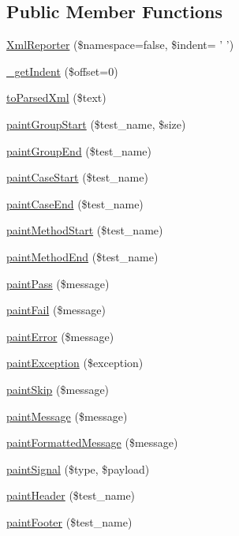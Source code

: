 \subsection*{Public Member Functions}
\begin{DoxyCompactItemize}
\item 
\hyperlink{class_xml_reporter_a3d2fe0351607e3552290a523825f2c71}{XmlReporter} (\$namespace=false, \$indent= ' ')
\item 
\hyperlink{class_xml_reporter_ab4a23bb48d3575347b0e5259e49a1b6f}{\_\-getIndent} (\$offset=0)
\item 
\hyperlink{class_xml_reporter_a5fda8560592459439b2f12436be5f352}{toParsedXml} (\$text)
\item 
\hyperlink{class_xml_reporter_a8260073ecaba7369ae53fde9251d1ef5}{paintGroupStart} (\$test\_\-name, \$size)
\item 
\hyperlink{class_xml_reporter_a448424e6e8bce6060c6ad6109fcb2300}{paintGroupEnd} (\$test\_\-name)
\item 
\hyperlink{class_xml_reporter_aebd11df8a848fa3f5b2d0d1b725249c1}{paintCaseStart} (\$test\_\-name)
\item 
\hyperlink{class_xml_reporter_a1d5e2bab9c6f61d49e65ec55e9a04015}{paintCaseEnd} (\$test\_\-name)
\item 
\hyperlink{class_xml_reporter_a9d879c209e50eadfcdbd8e3bfc7ba226}{paintMethodStart} (\$test\_\-name)
\item 
\hyperlink{class_xml_reporter_ae021130f96f98f7ff693740c331c31ae}{paintMethodEnd} (\$test\_\-name)
\item 
\hyperlink{class_xml_reporter_a0ca13e019e6eac83f1f5c91cae05f30d}{paintPass} (\$message)
\item 
\hyperlink{class_xml_reporter_afc04e91cbe663a1d38103392c9672b6f}{paintFail} (\$message)
\item 
\hyperlink{class_xml_reporter_adf32d80f48cfbfc4dcad63397e45ca8d}{paintError} (\$message)
\item 
\hyperlink{class_xml_reporter_a5525741fbc22b229dbc37de38df815cf}{paintException} (\$exception)
\item 
\hyperlink{class_xml_reporter_acab5f1fd58264ba3efb725b9a52db405}{paintSkip} (\$message)
\item 
\hyperlink{class_xml_reporter_af7b86039a6d741e8d5d86d6e85bcc82d}{paintMessage} (\$message)
\item 
\hyperlink{class_xml_reporter_ac6997a24df6320a76066b801b1f99154}{paintFormattedMessage} (\$message)
\item 
\hyperlink{class_xml_reporter_a813227fd450676eaaf89f3d513580e25}{paintSignal} (\$type, \$payload)
\item 
\hyperlink{class_xml_reporter_abd986228b92ae1f349b23254ad6a8c01}{paintHeader} (\$test\_\-name)
\item 
\hyperlink{class_xml_reporter_a76c2686a0abdea6a07ce6437b708cc71}{paintFooter} (\$test\_\-name)
\end{DoxyCompactItemize}
